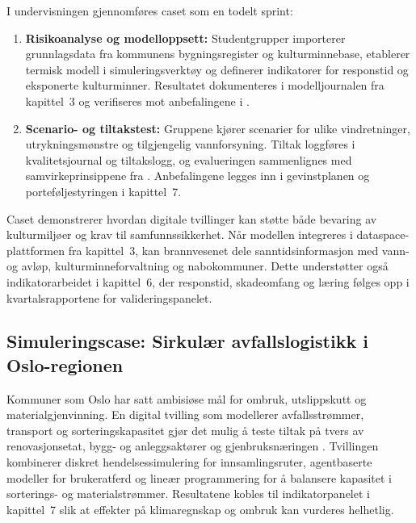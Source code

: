 I undervisningen gjennomføres caset som en todelt sprint:
\begin{enumerate}
    \item \textbf{Risikoanalyse og modelloppsett:} Studentgrupper importerer grunnlagsdata fra kommunens bygningsregister og kulturminnebase, etablerer termisk modell i simuleringsverktøy og definerer indikatorer for responstid og eksponerte kulturminner. Resultatet dokumenteres i modelljournalen fra kapittel~3 og verifiseres mot anbefalingene i \citet{dsb2021trehus}.
    \item \textbf{Scenario- og tiltakstest:} Gruppene kjører scenarier for ulike vindretninger, utrykningsmønstre og tilgjengelig vannforsyning. Tiltak loggføres i kvalitetsjournal og tiltakslogg, og evalueringen sammenlignes med samvirkeprinsippene fra \citet{dsb2023samvirke}. Anbefalingene legges inn i gevinstplanen og porteføljestyringen i kapittel~7.
\end{enumerate}

Caset demonstrerer hvordan digitale tvillinger kan støtte både bevaring av kulturmiljøer og krav til samfunnssikkerhet. Når modellen integreres i dataspace-plattformen fra kapittel~3, kan brannvesenet dele sanntidsinformasjon med vann- og avløp, kulturminneforvaltning og nabokommuner. Dette understøtter også indikatorarbeidet i kapittel~6, der responstid, skadeomfang og læring følges opp i kvartalsrapportene for valideringspanelet.

\subsection{Simuleringscase: Sirkulær avfallslogistikk i Oslo-regionen}
Kommuner som Oslo har satt ambisiøse mål for ombruk, utslippskutt og materialgjenvinning. En digital tvilling som modellerer avfallsstrømmer, transport og sorteringskapasitet gjør det mulig å teste tiltak på tvers av renovasjonsetat, bygg- og anleggsaktører og gjenbruksnæringen \citep{oslo2023sirkularstrategi,ren2024ressursdataplattform}. Tvillingen kombinerer diskret hendelsessimulering for innsamlingsruter, agentbaserte modeller for brukeratferd og lineær programmering for å balansere kapasitet i sorterings- og materialstrømmer. Resultatene kobles til indikatorpanelet i kapittel~7 slik at effekter på klimaregnskap og ombruk kan vurderes helhetlig.

